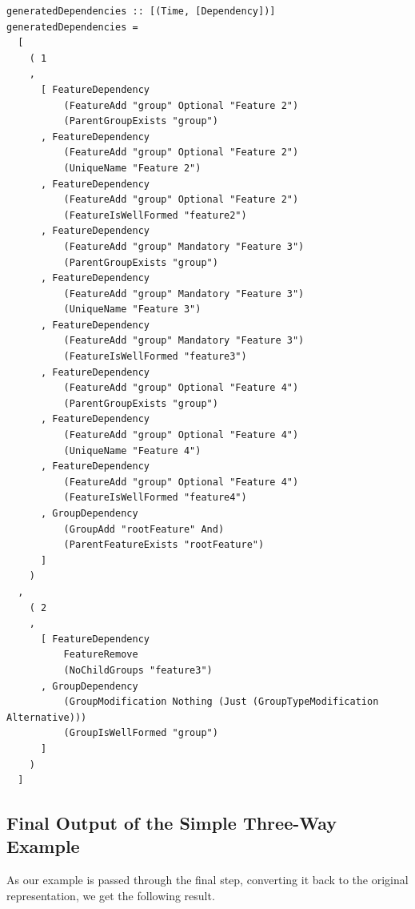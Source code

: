 \documentclass[a4paper,english]{ifimaster}
\begin{document}
\begin{verbatim}
generatedDependencies :: [(Time, [Dependency])]
generatedDependencies =
  [
    ( 1
    ,
      [ FeatureDependency
          (FeatureAdd "group" Optional "Feature 2")
          (ParentGroupExists "group")
      , FeatureDependency
          (FeatureAdd "group" Optional "Feature 2")
          (UniqueName "Feature 2")
      , FeatureDependency
          (FeatureAdd "group" Optional "Feature 2")
          (FeatureIsWellFormed "feature2")
      , FeatureDependency
          (FeatureAdd "group" Mandatory "Feature 3")
          (ParentGroupExists "group")
      , FeatureDependency
          (FeatureAdd "group" Mandatory "Feature 3")
          (UniqueName "Feature 3")
      , FeatureDependency
          (FeatureAdd "group" Mandatory "Feature 3")
          (FeatureIsWellFormed "feature3")
      , FeatureDependency
          (FeatureAdd "group" Optional "Feature 4")
          (ParentGroupExists "group")
      , FeatureDependency
          (FeatureAdd "group" Optional "Feature 4")
          (UniqueName "Feature 4")
      , FeatureDependency
          (FeatureAdd "group" Optional "Feature 4")
          (FeatureIsWellFormed "feature4")
      , GroupDependency
          (GroupAdd "rootFeature" And)
          (ParentFeatureExists "rootFeature")
      ]
    )
  ,
    ( 2
    ,
      [ FeatureDependency
          FeatureRemove
          (NoChildGroups "feature3")
      , GroupDependency
          (GroupModification Nothing (Just (GroupTypeModification Alternative)))
          (GroupIsWellFormed "group")
      ]
    )
  ]
\end{verbatim}

\subsection{Final Output of the Simple Three-Way Example}%
\label{sub:final_output_of_the_simple_three_way_example}

As our example is passed through the final step, converting it back to the original representation, we get the following result.
\end{document}
